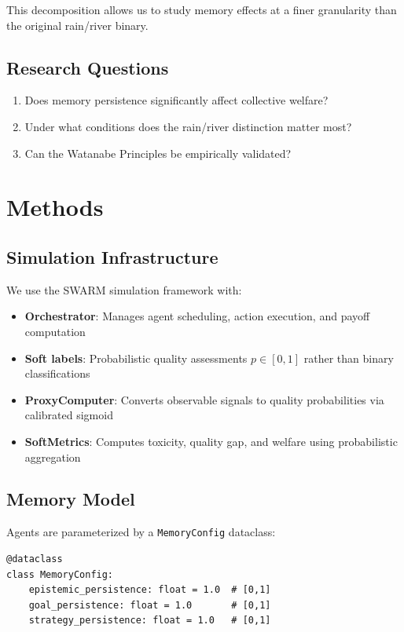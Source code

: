 \documentclass{article}
\begin{document}
This decomposition allows us to study memory effects at a finer granularity than the original rain/river binary.

\subsection{Research Questions}

\begin{enumerate}
\item Does memory persistence significantly affect collective welfare?
\item Under what conditions does the rain/river distinction matter most?
\item Can the Watanabe Principles be empirically validated?
\end{enumerate}

\section{Methods}

\subsection{Simulation Infrastructure}

We use the SWARM simulation framework with:
\begin{itemize}
\item \textbf{Orchestrator}: Manages agent scheduling, action execution, and payoff computation
\item \textbf{Soft labels}: Probabilistic quality assessments $p \in [0,1]$ rather than binary classifications
\item \textbf{ProxyComputer}: Converts observable signals to quality probabilities via calibrated sigmoid
\item \textbf{SoftMetrics}: Computes toxicity, quality gap, and welfare using probabilistic aggregation
\end{itemize}

\subsection{Memory Model}

Agents are parameterized by a \texttt{MemoryConfig} dataclass:

\begin{verbatim}
@dataclass
class MemoryConfig:
    epistemic_persistence: float = 1.0  # [0,1]
    goal_persistence: float = 1.0       # [0,1]
    strategy_persistence: float = 1.0   # [0,1]
\end{verbatim}
\end{document}

